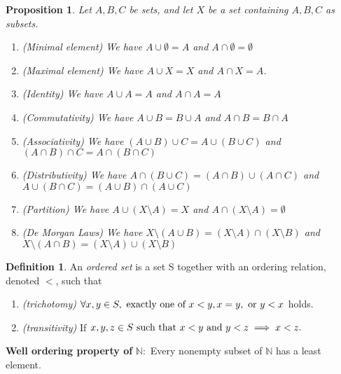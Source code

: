\documentclass{article}
\newtheorem{proposition}{Proposition}[section]
\theoremstyle{definition}
\newtheorem{definition}{Definition}[section]
\theoremstyle{remark}
\begin{document}
\begin{proposition}\label{prp:set_operations}
Let $A, B, C$ be sets, and let $X$ be a set containing $A, B, C$ as subsets. 
\begin{enumerate}
\item (Minimal element) We have $ A \cup \emptyset = A$ and $A \cap \emptyset = \emptyset$
\item (Maximal element) We have $ A \cup X = X$ and $ A \cap X = A$.
\item (Identity) We have $ A \cup A = A$ and $ A \cap A = A$
\item (Commutativity) We have $ A \cup B = B \cup A$ and $ A \cap B = B \cap A$
\item (Associativity) We have $ (A \cup B) \cup C = A \cup (B\cup C)$ and $ (A\cap B) \cap C = A \cap (B \cap C)$
\item (Distributivity) We have $ A \cap (B\cup C) = (A \cap B) \cup (A\cap C) $ and $ A \cup (B \cap C) = (A \cup B) \cap (A\cup C)$
\item (Partition) We have $ A \cup (X \setminus A) = X$ and $ A \cap (X \setminus A) = \emptyset$
\item (De Morgan Laws) We have $ X \setminus (A \cup B) = (X \setminus A) \cap (X \setminus B)$ and $ X \setminus (A \cap B) = (X \setminus A) \cup (X \setminus B)$
\end{enumerate}
\end{proposition}





\begin{definition}\label{def:ordered set}
An \textit{ordered set} is a set S together with an ordering relation, denoted \(<\), such that
\begin{enumerate}
\item \textit{(trichotomy)} \(\forall x,y \in S, \textnormal{ exactly one of } x < y, x=y, \textnormal{ or } y<x\) holds.
\item \textit{(transitivity)} If \(x,y,z \in S \textnormal{ such that } x < y \textnormal{ and } y < z \implies x < z.\)
\end{enumerate}
\textbf{Well ordering property of }\label{def:WOA}\(\mathbb{N}:\) Every nonempty subset of \(\mathbb{N}\) has a least element.
\end{definition}
\end{document}

